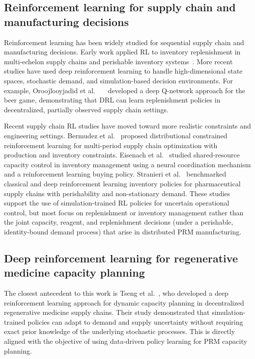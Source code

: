 \documentclass[preprint,review,12pt,nonatbib]{elsarticle}
\providecommand{\DIFadd}[1]{{\protect\color{blue}#1}} %
\providecommand{\DIFdel}[1]{} %
\providecommand{\DIFaddbegin}{} %
\providecommand{\DIFaddend}{} %
\providecommand{\DIFdelbegin}{} %
\providecommand{\DIFdelend}{} %
\providecommand{\DIFscaledelfig}{0.5}
\newlength{\DIFdelgraphicswidth} %
\newlength{\DIFdelgraphicsheight} %
\providecommand{\DIFaddincludegraphics}[2][]{{\color{blue}\fbox{\DIFOincludegraphics[#1]{#2}}}} %
\providecommand{\DIFdelincludegraphics}[2][]{%
\sbox{\DIFdelgraphicsbox}{\DIFOincludegraphics[#1]{#2}}%
\settoboxwidth{\DIFdelgraphicswidth}{\DIFdelgraphicsbox} %
\settoboxtotalheight{\DIFdelgraphicsheight}{\DIFdelgraphicsbox} %
\scalebox{\DIFscaledelfig}{%
\parbox[b]{\DIFdelgraphicswidth}{\usebox{\DIFdelgraphicsbox}\\[-\baselineskip] \rule{\DIFdelgraphicswidth}{0em}}\llap{\resizebox{\DIFdelgraphicswidth}{\DIFdelgraphicsheight}{%
\setlength{\unitlength}{\DIFdelgraphicswidth}%
\begin{picture}(1,1)%
\thicklines\linethickness{2pt} %
{\color[rgb]{1,0,0}\put(0,0){\framebox(1,1){}}}%
{\color[rgb]{1,0,0}\put(0,0){\line( 1,1){1}}}%
{\color[rgb]{1,0,0}\put(0,1){\line(1,-1){1}}}%
\end{picture}%
}\hspace*{3pt}}} %
} %
\DeclareRobustCommand{\DIFaddbegin}{\DIFOaddbegin \let\includegraphics\DIFaddincludegraphics} %
\DeclareRobustCommand{\DIFaddend}{\DIFOaddend \let\includegraphics\DIFOincludegraphics} %
\DeclareRobustCommand{\DIFdelbegin}{\DIFOdelbegin \let\includegraphics\DIFdelincludegraphics} %
\DeclareRobustCommand{\DIFdelend}{\DIFOaddend \let\includegraphics\DIFOincludegraphics} %
\begin{document}
\subsection{Reinforcement learning for supply chain and manufacturing decisions}
Reinforcement learning has been widely studied for sequential supply chain and manufacturing decisions. Early work applied RL to inventory replenishment in multi-echelon supply chains and perishable inventory systems~\cite{GIANNOCCARO2002153,KARA2018150}. More recent studies have used deep reinforcement learning to handle high-dimensional state spaces, stochastic demand, and simulation-based decision environments. For example, Oroojlooyjadid et al.~\DIFdelbegin \DIFdel{\mbox{%
\cite{article1} }\hskip0pt%
}\DIFdelend \DIFaddbegin \DIFadd{\mbox{%
\cite{Oroojlooyjadid2022BeerGame} }\hskip0pt%
}\DIFaddend developed a deep Q-network approach for the beer game, demonstrating that DRL can learn replenishment policies in decentralized, partially observed supply chain settings.
\DIFdelbegin \DIFdel{Wang et al.~\mbox{%
\cite{article2} }\hskip0pt%
combined reinforcement learning with multi-agent simulation for dynamic inventory replenishment in an aerospace manufacturing supply chain.
}\DIFdelend 

Recent supply chain RL studies have moved toward more realistic constraints and engineering settings. Bermudez et al.~\cite{Bermudez2023DCPO} proposed distributional constrained reinforcement learning for multi-period supply chain optimization with production and inventory constraints. Eisenach et al.~\cite{Eisenach2024NeuralCoordination} studied shared-resource capacity control in inventory management using a neural coordination mechanism and a reinforcement learning buying policy. Stranieri et al.~\cite{Stranieri2025PharmaDRL} benchmarked classical and deep reinforcement learning inventory policies for pharmaceutical supply chains with perishability and non-stationary demand. These studies support the use of simulation-trained RL policies for uncertain operational control, but most focus on replenishment or inventory management rather than the joint capacity, \DIFdelbegin \DIFdel{inventory, specimen transshipment, and demand-sharing decisions }\DIFdelend \DIFaddbegin \DIFadd{reagent, and replenishment decisions (under a perishable, identity-bound demand process) }\DIFaddend that arise in distributed PRM manufacturing.

\subsection{Deep reinforcement learning for regenerative medicine capacity planning}
The closest antecedent to this work is Tseng et al.~\cite{Tseng2023DeepRL}, who developed a deep reinforcement learning approach for dynamic capacity planning in decentralized regenerative medicine supply chains. Their study demonstrated that simulation-trained policies can adapt to demand and supply uncertainty without requiring exact prior knowledge of the underlying stochastic processes. This is directly aligned with the objective of using data-driven policy learning for PRM capacity planning.
\end{document}
